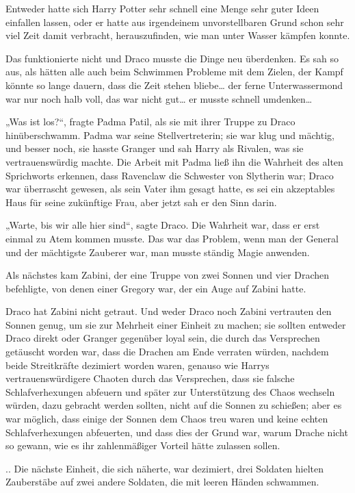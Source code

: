 {Entweder hatte sich Harry Potter sehr schnell eine Menge sehr guter Ideen einfallen lassen, oder er hatte aus irgendeinem unvorstellbaren Grund schon sehr viel Zeit damit verbracht, herauszufinden, wie man unter Wasser kämpfen konnte.

Das funktionierte nicht und Draco musste die Dinge neu überdenken. Es sah so aus, als hätten alle auch beim Schwimmen Probleme mit dem Zielen, der Kampf könnte so lange dauern, dass die Zeit stehen bliebe… der ferne Unterwassermond war nur noch halb voll, das war nicht gut… er musste schnell umdenken…

„Was ist los?“, fragte Padma Patil, als sie mit ihrer Truppe zu Draco hinüberschwamm. Padma war seine Stellvertreterin; sie war klug und mächtig, und besser noch, sie hasste Granger und sah Harry als Rivalen, was sie vertrauenswürdig machte. Die Arbeit mit Padma ließ ihn die Wahrheit des alten Sprichworts erkennen, dass Ravenclaw die Schwester von Slytherin war; Draco war überrascht gewesen, als sein Vater ihm gesagt hatte, es sei ein akzeptables Haus für seine zukünftige Frau, aber jetzt sah er den Sinn darin.

„Warte, bis wir alle hier sind“, sagte Draco. Die Wahrheit war, dass er erst einmal zu Atem kommen musste. Das war das Problem, wenn man der General und der mächtigste Zauberer war, man musste ständig Magie anwenden.

Als nächstes kam Zabini, der eine Truppe von zwei Sonnen und vier Drachen befehligte, von denen einer Gregory war, der ein Auge auf Zabini hatte.

Draco hat Zabini nicht getraut. Und weder Draco noch Zabini vertrauten den Sonnen genug, um sie zur Mehrheit einer Einheit zu machen; sie sollten entweder Draco direkt oder Granger gegenüber loyal sein, die durch das Versprechen getäuscht worden war, dass die Drachen am Ende verraten würden, nachdem beide Streitkräfte dezimiert worden waren, genauso wie Harrys vertrauenswürdigere Chaoten durch das Versprechen, dass sie falsche Schlafverhexungen abfeuern und später zur Unterstützung des Chaos wechseln würden, dazu gebracht werden sollten, nicht auf die Sonnen zu schießen; aber es war möglich, dass einige der Sonnen dem Chaos treu waren und keine echten Schlafverhexungen abfeuerten, und dass dies der Grund war, warum Drache nicht so gewann, wie es ihr zahlenmäßiger Vorteil hätte zulassen sollen.

.. Die nächste Einheit, die sich näherte, war dezimiert, drei Soldaten hielten Zauberstäbe auf zwei andere Soldaten, die mit leeren Händen schwammen.

}
